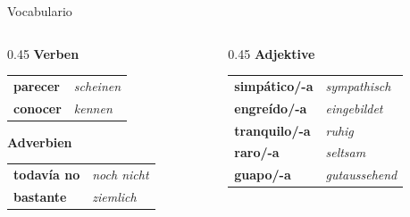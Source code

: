 \documentclass[aspectratio=169, 11pt]{beamer}
\newcommand{\seriftext}[1]{{\fontfamily{ppl}\selectfont #1}}
\newcommand{\es}[1]{\seriftext{\textbf{#1}}}
\newcommand{\de}[1]{\textit{\textcolor{mittelgrau}{#1}}}
\begin{document}
\begin{frame}{Vocabulario}
    \vspace{0.3cm}

    \begin{columns}[T]
        \begin{column}{0.45\textwidth}
            \textbf{Verben}

            \vspace{0.4cm}

            \begin{tabular}{@{}ll@{}}
                \es{parecer} & \de{scheinen} \\[0.4em]
                \es{conocer} & \de{kennen} \\
            \end{tabular}

            \vspace{0.6cm}

            \textbf{Adverbien}

            \vspace{0.4cm}

            \begin{tabular}{@{}ll@{}}
                \es{todavía no} & \de{noch nicht} \\[0.4em]
                \es{bastante} & \de{ziemlich} \\
            \end{tabular}
        \end{column}

        \begin{column}{0.45\textwidth}
            \textbf{Adjektive}

            \vspace{0.4cm}

            \begin{tabular}{@{}ll@{}}
                \es{simpático/-a} & \de{sympathisch} \\[0.4em]
                \es{engreído/-a} & \de{eingebildet} \\[0.4em]
                \es{tranquilo/-a} & \de{ruhig} \\[0.4em]
                \es{raro/-a} & \de{seltsam} \\[0.4em]
                \es{guapo/-a} & \de{gutaussehend} \\
            \end{tabular}
        \end{column}
    \end{columns}
\end{frame}
\end{document}
